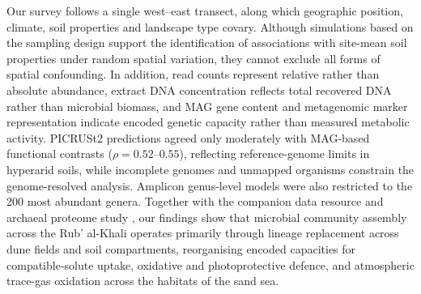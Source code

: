 \documentclass[fleqn,10pt,numbers]{olplainarticle}
\begin{document}



Our survey follows a single west--east transect, along which geographic position, climate, soil properties and landscape type covary. Although simulations based on the sampling design support the identification of associations with site-mean soil properties under random spatial variation, they cannot exclude all forms of spatial confounding. In addition, read counts represent relative rather than absolute abundance, extract DNA concentration reflects total recovered DNA rather than microbial biomass, and MAG gene content and metagenomic marker representation indicate encoded genetic capacity rather than measured metabolic activity. PICRUSt2 predictions agreed only moderately with MAG-based functional contrasts ($\rho=0.52$--$0.55$), reflecting reference-genome limits in hyperarid soils, while incomplete genomes and unmapped organisms constrain the genome-resolved analysis. Amplicon genus-level models were also restricted to the 200 most abundant genera. Together with the companion data resource \cite{rubalkhali_datapaper} and archaeal proteome study \cite{proteome_companion}, our findings show that microbial community assembly across the Rub' al-Khali operates primarily through lineage replacement across dune fields and soil compartments, reorganising encoded capacities for compatible-solute uptake, oxidative and photoprotective defence, and atmospheric trace-gas oxidation across the habitats of the sand sea.
\end{document}
